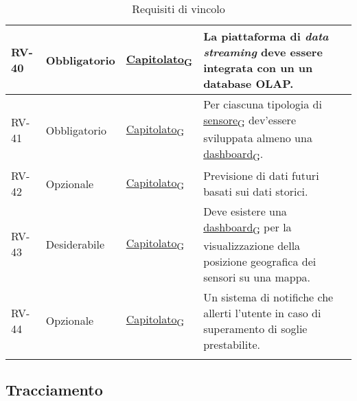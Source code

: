 \begin{longtable}{|>{\centering\arraybackslash}m{}|>{\centering\arraybackslash}m{}|>{\centering\arraybackslash}m{}|>{\centering\arraybackslash}m{}|}
	RV-40           & Obbligatorio        & \href{https://7last.github.io/docs/rtb/documentazione-interna/glossario\#capitolato}{Capitolato\textsubscript{G}} & La piattaforma di \textit{data streaming} deve essere integrata con un un database OLAP.                                                                                                                                                                                                \\\hline
	RV-41           & Obbligatorio        & \href{https://7last.github.io/docs/rtb/documentazione-interna/glossario\#capitolato}{Capitolato\textsubscript{G}} & Per ciascuna tipologia di \href{https://7last.github.io/docs/rtb/documentazione-interna/glossario\#sensore}{sensore\textsubscript{G}} dev'essere sviluppata almeno una \href{https://7last.github.io/docs/rtb/documentazione-interna/glossario\#dashboard}{dashboard\textsubscript{G}}. \\\hline
	RV-42           & Opzionale           & \href{https://7last.github.io/docs/rtb/documentazione-interna/glossario\#capitolato}{Capitolato\textsubscript{G}} & Previsione di dati futuri basati sui dati storici.                                                                                                                                                                                                                                      \\\hline
	RV-43           & Desiderabile        & \href{https://7last.github.io/docs/rtb/documentazione-interna/glossario\#capitolato}{Capitolato\textsubscript{G}} & Deve esistere una \href{https://7last.github.io/docs/rtb/documentazione-interna/glossario\#dashboard}{dashboard\textsubscript{G}} per la visualizzazione della posizione geografica dei sensori su una mappa.                                                                           \\\hline
	RV-44           & Opzionale           & \href{https://7last.github.io/docs/rtb/documentazione-interna/glossario\#capitolato}{Capitolato\textsubscript{G}} & Un sistema di notifiche che allerti l'utente in caso di superamento di soglie prestabilite.                                                                                                                                                                                             \\\hline
	\caption{Requisiti di vincolo}
	\label{table:3}
\end{longtable}


\subsection{Tracciamento}
